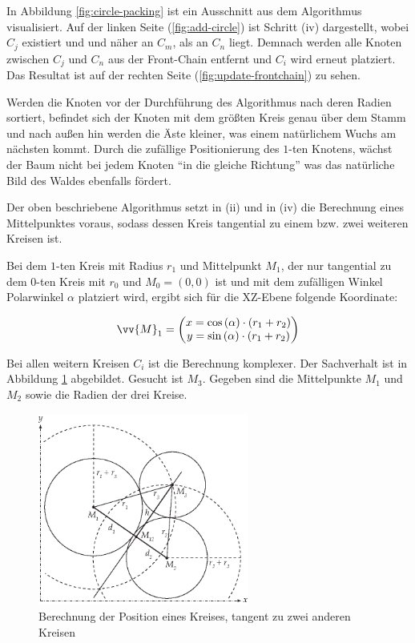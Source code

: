 In Abbildung \ref{fig:circle-packing} ist ein Ausschnitt aus dem Algorithmus visualisiert. Auf der linken Seite (\ref{fig:add-circle}) ist Schritt (iv) dargestellt, wobei $C_j$ existiert und und näher an $C_m$, als an $C_n$ liegt. Demnach werden alle Knoten zwischen $C_j$ und $C_n$ aus der Front-Chain entfernt und $C_i$ wird erneut platziert. Das Resultat ist auf der rechten Seite (\ref{fig:update-frontchain}) zu sehen.

Werden die Knoten vor der Durchführung des Algorithmus nach deren Radien sortiert, befindet sich der Knoten mit dem größten Kreis genau über dem Stamm und nach außen hin werden die Äste kleiner, was einem natürlichem Wuchs am nächsten kommt. Durch die zufällige Positionierung des $1$-ten Knotens, wächst der Baum nicht bei jedem Knoten "`in die gleiche Richtung"' was das natürliche Bild des Waldes ebenfalls fördert.

Der oben beschriebene Algorithmus setzt in (ii) und in (iv) die Berechnung eines Mittelpunktes voraus, sodass dessen Kreis tangential zu einem bzw. zwei weiteren Kreisen ist.

Bei dem $1$-ten Kreis mit Radius $r_1$ und Mittelpunkt $M_1$, der nur tangential zu dem $0$-ten Kreis mit $r_0$ und $M_0 = (0,0)$ ist und mit dem zufälligen Winkel Polarwinkel $\alpha$ platziert wird, ergibt sich für die XZ-Ebene folgende Koordinate:

\begin{equation}
  \vv{M}_1 =
  \begin{pmatrix}
    x = \cos\left(\alpha\right) \cdot \left(r_1 + r_2\right)\\
    y = \sin\left(\alpha\right) \cdot \left(r_1 + r_2\right)\\
  \end{pmatrix}
\end{equation}

Bei allen weitern Kreisen $C_i$ ist die Berechnung komplexer. Der Sachverhalt ist in Abbildung \ref{fig:tangent-circle} abgebildet. Gesucht ist $M_3$. Gegeben sind die Mittelpunkte $M_1$ und $M_2$ sowie die Radien der drei Kreise.

\begin{figure}[htb]
  \includegraphics[width=261.593px]{figures/tangent-circle}
  \caption{Berechnung der Position eines Kreises, tangent zu zwei anderen Kreisen}
  \label{fig:tangent-circle}
\end{figure}


